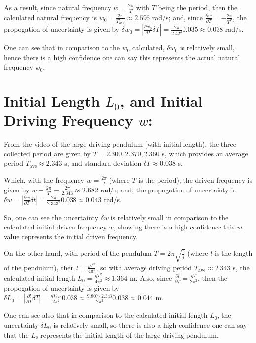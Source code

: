 \documentclass{article}
\begin{document}
As a result, since natural frequency $w = \frac{2\pi}{T}$ with $T$ being the period, then the calculated natural frequency is $w_0 = \frac{2\pi}{T_\text{ave}} \approx 2.596$ rad/s; and, since $\frac{\partial w}{\partial T} = -\frac{2\pi}{T^2}$, the propogation of uncertainty is given by $\delta w_0 = \left|\frac{\partial w_0}{\partial T}\delta T\right| = \frac{2\pi}{2.42^2}0.035 \approx 0.038$ rad/s.

One can see that in comparison to the $w_0$ calculated, $\delta w_0$ is relatively small, hence there is a high confidence one can say this represents the actual natural frequency $w_0$.

\hfil

\section{Initial Length $L_0$, and Initial Driving Frequency $w$:}
From the video of the large driving pendulum (with initial length), the three collected period are given by $T=2.300,2.370,2.360$ s, which provides an average period $T_\text{ave} \approx 2.343$ s, and standard deviation $\delta T\approx 0.038$ s.

Which, with the frequency $w = \frac{2\pi}{T}$ (where $T$ is the period), the driven frequency is given by $w = \frac{2\pi}{T} = \frac{2\pi}{2.343} \approx 2.682$ rad/s; and, the propogation of uncertainty is $\delta w=\left|\frac{\partial w}{\partial T}\delta t\right| = \frac{2\pi}{2.343^2}0.038\approx 0.043$ rad/s.

So, one can see the uncertainty $\delta w$ is relatively small in comparison to the calculated initial driven frequency $w$, showing there is a high confidence this $w$ value represents the initial driven frequency.

\hfil

On the other hand, with period of the pendulum $T = 2\pi\sqrt{\frac{l}{g}}$ (where $l$ is the length of the pendulum), then $l = \frac{gT^2}{4\pi^2}$, so with average driving period $T_\text{ave} \approx 2.343$ s, the calculated initial length $L_0 = \frac{gT^2}{4\pi^2} \approx 1.364$ m. Also, since $\frac{\partial l}{\partial T} = \frac{gT}{2\pi^2}$, then the propogation of uncertainty is given by $\delta L_0 = \left|\frac{\partial l}{\partial T}\delta T\right| = \frac{g T_\text{ave}}{2\pi^2}0.038 \approx \frac{9.807 \cdot 2.343}{2\pi^2}0.038 \approx 0.044$ m.

One can see also that in comparison to the calculated initial length $L_0$, the uncertainty $\delta L_0$ is relatively small, so there is also a high confidence one can say that the $L_0$ represents the initial length of the large driving pendulum.
\end{document}

